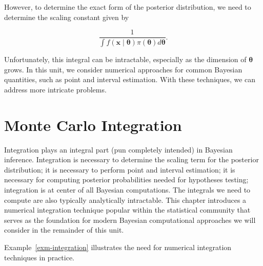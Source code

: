 \documentclass[
  letterpaper,
  DIV=11,
  numbers=noendperiod]{scrreprt}
\theoremstyle{definition}
\theoremstyle{definition}
\theoremstyle{plain}
\theoremstyle{remark}
\begin{document}
However, to determine the exact form of the posterior distribution, we
need to determine the scaling constant given by

\[\frac{1}{\int f(\mathbf{x} \mid \boldsymbol{\theta}) \pi(\boldsymbol{\theta}) d\boldsymbol{\theta}}.\]

Unfortunately, this integral can be intractable, especially as the
dimension of \(\boldsymbol{\theta}\) grows. In this unit, we consider
numerical approaches for common Bayesian quantities, such as point and
interval estimation. With these techniques, we can address more
intricate problems.

\hypertarget{sec-mc-integration}{%
\chapter{Monte Carlo Integration}\label{sec-mc-integration}}

\providecommand{\norm}[1]{\lVert#1\rVert}
\providecommand{\abs}[1]{\lvert#1\rvert}
\providecommand{\iid}{\stackrel{\text{IID}}{\sim}}
\providecommand{\ind}{\stackrel{\text{Ind}}{\sim}}

\providecommand{\bm}[1]{\mathbf{#1}}
\providecommand{\bs}[1]{\boldsymbol{#1}}
\providecommand{\bbeta}{\bs{\beta}}

\providecommand{\Ell}{\mathcal{L}}
\providecommand{\indep}{\perp\negthickspace\negmedspace\perp}

Integration plays an integral part (pun completely intended) in Bayesian
inference. Integration is necessary to determine the scaling term for
the posterior distribution; it is necessary to perform point and
interval estimation; it is necessary for computing posterior
probabilities needed for hypotheses testing; integration is at center of
all Bayesian computations. The integrals we need to compute are also
typically analytically intractable. This chapter introduces a numerical
integration technique popular within the statistical community that
serves as the foundation for modern Bayesian computational approaches we
will consider in the remainder of this unit.

Example~\ref{exm-integration} illustrates the need for numerical
integration techniques in practice.
\end{document}
